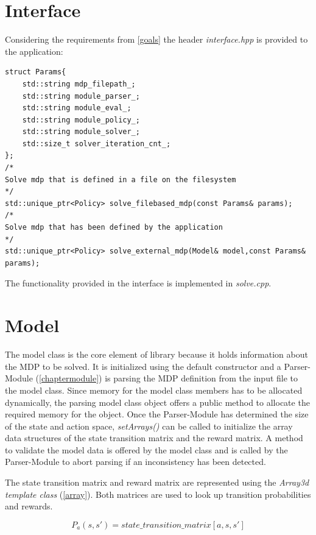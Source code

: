\section{Interface}

Considering the requirements from \autoref{goals} the header \emph{interface.hpp} is provided to the application:

\begin{lstlisting}
struct Params{
	std::string mdp_filepath_;
	std::string module_parser_;
	std::string module_eval_;
	std::string module_policy_;
	std::string module_solver_;
	std::size_t solver_iteration_cnt_;
};
/*
Solve mdp that is defined in a file on the filesystem
*/
std::unique_ptr<Policy> solve_filebased_mdp(const Params& params);
/*
Solve mdp that has been defined by the application
*/
std::unique_ptr<Policy> solve_external_mdp(Model& model,const Params& params);

\end{lstlisting}

The functionality provided in the interface is implemented in \emph{solve.cpp}. 

\section{Model}

The model class is the core element of library because it holds information about the MDP to be solved. It is initialized using the default constructor and a Parser-Module (\autoref{chaptermodule}) is parsing the MDP definition from the input file to the model class. Since memory for the model class members has to be allocated dynamically, the parsing model class object offers a public method to allocate the required memory for the object. Once the Parser-Module has determined the size of the state and action space, \emph{setArrays()} can be called to initialize the array data structures of the state transition matrix and the reward matrix. A method to validate the model data is offered by the model class and is called by the Parser-Module to abort parsing if an inconsistency has been detected. 

The state transition matrix and reward matrix are represented using the \emph{Array3d template class} (\autoref{array}).
Both matrices are used to look up transition probabilities and rewards.

\begin{equation}
P_a(s,s') = state\_transition\_matrix[a,s,s']
\end{equation}

